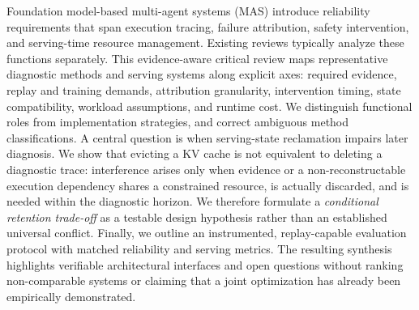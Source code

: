 Foundation model-based multi-agent systems (MAS) introduce reliability requirements that span execution tracing, failure attribution, safety intervention, and serving-time resource management. Existing reviews typically analyze these functions separately. This evidence-aware critical review maps representative diagnostic methods and serving systems along explicit axes: required evidence, replay and training demands, attribution granularity, intervention timing, state compatibility, workload assumptions, and runtime cost. We distinguish functional roles from implementation strategies, and correct ambiguous method classifications. A central question is when serving-state reclamation impairs later diagnosis. We show that evicting a KV cache is not equivalent to deleting a diagnostic trace: interference arises only when evidence or a non-reconstructable execution dependency shares a constrained resource, is actually discarded, and is needed within the diagnostic horizon. We therefore formulate a \emph{conditional retention trade-off} as a testable design hypothesis rather than an established universal conflict. Finally, we outline an instrumented, replay-capable evaluation protocol with matched reliability and serving metrics. The resulting synthesis highlights verifiable architectural interfaces and open questions without ranking non-comparable systems or claiming that a joint optimization has already been empirically demonstrated.